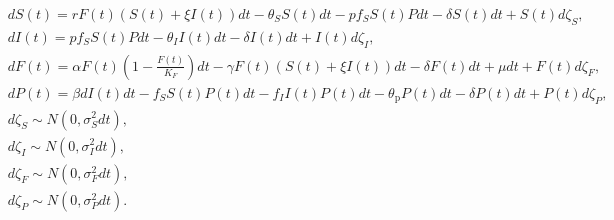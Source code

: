\documentclass[12pt]{article}
\begin{document}
{
\small
\begin{align}
&d S(t) = r F(t)\left(S(t)+\xi I(t)\right)dt - \theta_{S}S(t) dt - p f_{S} S(t) Pdt - \delta S(t)dt + S(t) d\zeta_{S},\\
&d I(t) = p f_{S} S(t) Pdt - \theta_{I} I(t)dt - \delta I(t)dt + I(t) d\zeta_{I},\\
&dF(t) = \alpha F(t)\left(1-\frac{F(t)}{K_F}\right)dt - \gamma F(t) \left(S(t)+\xi I(t)\right) dt - \delta F(t) dt + \mu dt + F(t) d\zeta_F,\\
&d P(t) = \beta d I(t)dt - f_{S} S(t) P(t)dt - f_{I} I(t) P(t)dt - \theta_{\mathrm{p}} P(t)dt - \delta P(t) dt + P(t) d\zeta_{P},\\
&d\zeta_{S} \sim N\left(0, \sigma_{S}^{2}dt\right),\\
&d\zeta_{I} \sim N\left(0, \sigma_{I}^{2}dt\right),\\
&d\zeta_{F} \sim N\left(0, \sigma_{F}^{2}dt\right),\\
&d\zeta_{P} \sim N\left(0, \sigma_{P}^{2}dt\right).
\end{align}
}
\end{document}
